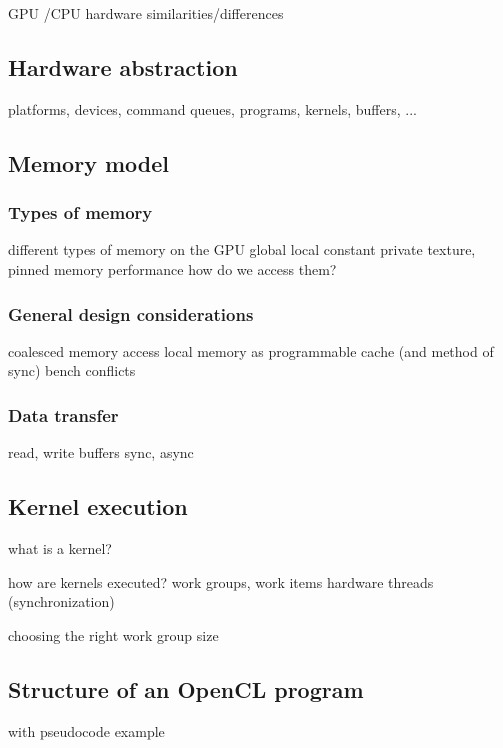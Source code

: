GPU /CPU hardware
similarities/differences

\subsection{Hardware abstraction}
platforms, devices, command queues, programs, kernels, buffers, ...

\subsection{Memory model}

\subsubsection{Types of memory}
different types of memory on the GPU
global local constant private
texture, pinned memory
performance
how do we access them?

\subsubsection{General design considerations}
coalesced memory access
local memory as programmable cache (and method of sync)
bench conflicts

\subsubsection{Data transfer}
read, write buffers
sync, async

\subsection{Kernel execution}
what is a kernel?

how are kernels executed?
work groups, work items
hardware threads (synchronization)

choosing the right work group size

\subsection{Structure of an OpenCL program}

with pseudocode example

